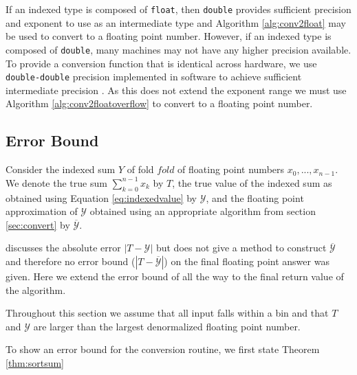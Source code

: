 \documentclass[12pt]{article}
\theoremstyle{plain}
\begin{document}
    If an indexed type is composed of \verb|float|, then \verb|double| provides sufficient precision and exponent to use as an intermediate type and Algorithm \ref{alg:conv2float} may be used to convert to a floating point number.
    However, if an indexed type is composed of \verb|double|, many machines may not have any higher precision available. To provide a conversion function that is identical across hardware, we use \verb|double-double| precision implemented in software to achieve sufficient intermediate precision \cite{doubledouble}. As this does not extend the exponent range we must use Algorithm \ref{alg:conv2floatoverflow} to convert to a floating point number.

  \subsection{Error Bound}
    Consider the indexed sum $Y$ of fold $fold$ of floating point numbers $x_0, ..., x_{n - 1}$. We denote the true sum $\sum \limits_{k = 0}^{n - 1} x_k$ by $T$, the true value of the indexed sum as obtained using Equation \ref{eq:indexedvalue} by $\mathcal{Y}$, and the floating point approximation of $\mathcal{Y}$ obtained using an appropriate algorithm from section \ref{sec:convert} by $\overline{\mathcal{Y}}$.

    \cite{repsum} discusses the absolute error $|T - \mathcal{Y}|$ but does not give a method to construct $\overline{\mathcal{Y}}$ and therefore no error bound ($|T - \overline{\mathcal{Y}}|$) on the final floating point answer was given. Here we extend the error bound of \cite{repsum} all the way to the final return value of the algorithm.

    Throughout this section we assume that all input falls within a bin and that $T$ and $\mathcal{Y}$ are larger than the largest denormalized floating point number.

    To show an error bound for the conversion routine, we first state Theorem \ref{thm:sortsum}
\end{document}
